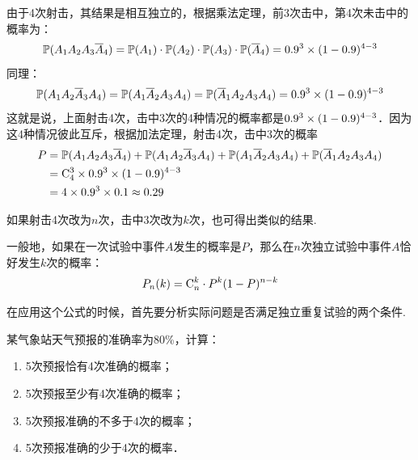 由于4次射击，其结果是相互独立的，根据乘法定理，前3次击中，第4次未击中的概率为：
\[\mathbb{P}(A_1A_2A_3\overline{A}_4)=\mathbb{P}(A_1)\cdot \mathbb{P}(A_2)\cdot \mathbb{P}(A_3)\cdot \mathbb{P}(\overline{A}_4)=0.9^3\times(1-0.9)^{4-3}\]
同理：
$$\mathbb{P}(A_1A_2\overline{A}_3A_4)=\mathbb{P}(A_1\overline{A}_2A_3A_4)=\mathbb{P}(\overline{A}_1A_2A_3A_4)=0.9^3\times(1-0.9)^{4-3}$$
这就是说，上面射击4次，击中3次的4种情况的概率都是$0.9^3\times(1-0.9)^{4-3}$．因为这4种情况彼此互斥，根据加法定理，射击4次，击中3次的概率
\[\begin{split}
    P&=\mathbb{P}(A_1A_2A_3\overline{A}_4)+\mathbb{P}(A_1A_2\overline{A}_3A_4)+\mathbb{P}(A_1\overline{A}_2A_3A_4)+\mathbb{P}(\overline{A}_1A_2A_3A_4)\\
    &={\rm C}^{3}_{4}\times 0.9^3\times(1-0.9)^{4-3}\\
    &=4\times 0.9^3\times0.1\approx 0.29
\end{split}\]

如果射击4次改为$n$次，击中3次改为$k$次，也可得出类似的结果.

一般地，如果在一次试验中事件$A$发生的概率是$P$，那么在$n$次独立试验中事件$A$恰好发生$k$次的概率：
\[P_n(k)={\rm C}^{k}_{n}\cdot P^k(1-P)^{n-k}\]

在应用这个公式的时候，首先要分析实际问题是否满足独立重复试验的两个条件.


\begin{example}
    某气象站天气预报的准确率为80\%，计算：
\begin{enumerate}[(1)]
\item 5次预报恰有4次准确的概率；
\item 5次预报至少有4次准确的概率；
\item 5次预报准确的不多于4次的概率；
\item 5次预报准确的少于4次的概率．
\end{enumerate}

\end{example}

